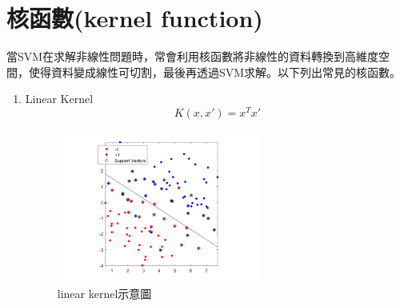 \section{核函數(kernel function)}

當SVM在求解非線性問題時，常會利用核函數將非線性的資料轉換到高維度空間，使得資料變成線性可切割，最後再透過SVM求解。以下列出常見的核函數。
\begin{enumerate}
	\item
	      Linear Kernel
	      \begin{equation}
		      \label{eqn:LinearKernel}
		      K(x,x')=x^Tx'
	      \end{equation}

	      \begin{figure}[H]
		      \centerline{\includegraphics[height=5cm]{pic/linear kernel.png}}
		      \caption{linear kernel示意圖}
		      \label{fig:linear kernel}
	      \end{figure}


\end{enumerate}
